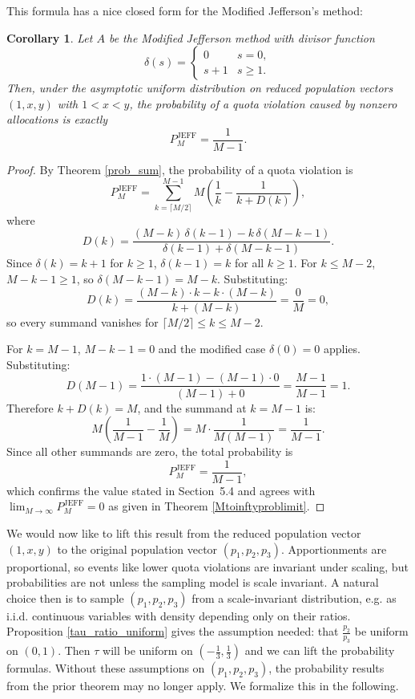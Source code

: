 \documentclass[11pt]{article}
\newtheorem{corollary}{Corollary}[theorem]
\theoremstyle{definition}
\theoremstyle{definition}
\begin{document}
This formula has a nice closed form for the Modified Jefferson's method: 

\begin{corollary}\label{jeff_closedform}
Let $A$ be the Modified Jefferson method with divisor function
\[
\delta(s) = \begin{cases} 0 & s = 0, \\ s + 1 & s \geq 1. \end{cases}
\]
Then, under the asymptotic uniform distribution on reduced population vectors $(1, x, y)$
with $1 < x < y$, the probability of a quota violation caused by nonzero allocations is
exactly
\[
P_M^{\mathrm{JEFF}} = \frac{1}{M-1}.
\]
\end{corollary}

\begin{proof}
By Theorem \ref{prob_sum}, the probability of a quota violation is
\[
P_M^{\mathrm{JEFF}} = \sum_{k=\lceil M/2 \rceil}^{M-1} M\left(\frac{1}{k} - 
\frac{1}{k + D(k)}\right),
\]
where
\[
D(k) = \frac{(M-k)\,\delta(k-1) - k\,\delta(M-k-1)}{\delta(k-1) + \delta(M-k-1)}.
\]
Since $\delta(k) = k+1$ for $k \geq 1$, $\delta(k-1) = k$ for all $k \geq 1$.
For $k \leq M-2$, $M - k - 1 \geq 1$, so $\delta(M-k-1) = M - k$. Substituting:
\[
D(k) = \frac{(M-k)\cdot k - k\cdot(M-k)}{k + (M-k)} = \frac{0}{M} = 0,
\]
so every summand vanishes for $\lceil M/2 \rceil \leq k \leq M-2$.

For $k = M-1$, $M - k - 1 = 0$ and the modified case $\delta(0) = 0$ applies. Substituting:
\[
D(M-1) = \frac{1 \cdot (M-1) - (M-1) \cdot 0}{(M-1) + 0} = \frac{M-1}{M-1} = 1.
\]
Therefore $k + D(k) = M$, and the summand at $k = M-1$ is:
\[
M\left(\frac{1}{M-1} - \frac{1}{M}\right) = M \cdot \frac{1}{M(M-1)} = \frac{1}{M-1}.
\]
Since all other summands are zero, the total probability is
\[
P_M^{\mathrm{JEFF}} = \frac{1}{M-1},
\]
which confirms the value stated in Section~5.4 and agrees with 
$\lim_{M\to\infty} P_M^{\mathrm{JEFF}} = 0$ as given in Theorem \ref{Mtoinftyproblimit}.
\end{proof}


We would now like to lift this result from the reduced population vector $(1,x,y)$ to the original population vector $(p_1,p_2,p_3)$. Apportionments are proportional, so events like lower quota violations are invariant under scaling, but probabilities are not unless the sampling model is scale invariant. A natural choice then is to sample $(p_1,p_2,p_3)$ from a scale-invariant distribution, e.g. as i.i.d. continuous variables with density depending only on their ratios. Proposition \ref{tau_ratio_uniform} gives the assumption needed: that $\frac{p_2}{p_3}$ be uniform on $(0,1)$. Then $\tau$ will be uniform on $(-\frac13, \frac13)$ and we can lift the probability formulas. Without these assumptions on $(p_1,p_2,p_3)$, the probability results from the prior theorem may no longer apply. We formalize this in the following. 
\end{document}
